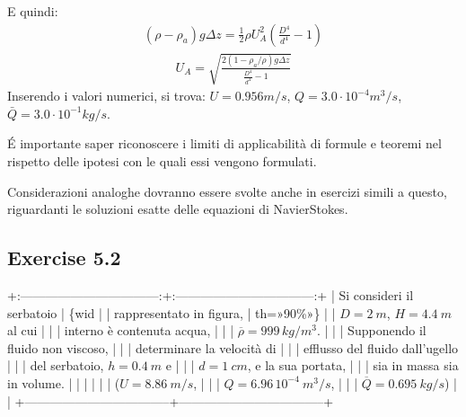 \documentclass[letterpaper,10pt,italian]{jupyterBook}
\begin{document}
\begin{itemize}
\begin{equation*}
\end{equation*}
\sphinxAtStartPar
E quindi:
\begin{equation*}
\begin{split}(\rho - \rho_a ) g \Delta z = \frac{1}{2}\rho U_A^2 \displaystyle\left( \frac{D^4}{d^4} - 1 \right)\end{split}
\end{equation*}\begin{equation*}
\begin{split}U_A = \displaystyle\sqrt{\frac{2 (1 - \rho_a / \rho) g \Delta z}{\frac{D^4}{d^4} - 1}}\end{split}
\end{equation*}
\sphinxAtStartPar
Inserendo i valori numerici, si trova: \(U = 0.956 m/s\),
\(Q = 3.0 \cdot 10^{-4} m^3/s\), \(\bar{Q} = 3.0 \cdot 10^{-1} kg/s\).

\end{itemize}

\sphinxAtStartPar
{} É importante saper riconoscere i limiti di applicabilità
di formule e teoremi nel rispetto delle ipotesi con le quali essi
vengono formulati.

\sphinxAtStartPar
Considerazioni analoghe dovranno essere svolte anche in esercizi simili
a questo, riguardanti le soluzioni esatte delle equazioni di
Navier\sphinxhyphen{}Stokes.

\sphinxstepscope


\subsection{Exercise 5.2}
\label{\detokenize{polimi/fluidmechanics-ita/template/capitoli/05_bernoulli/0501in:exercise-5-2}}\label{\detokenize{polimi/fluidmechanics-ita/template/capitoli/05_bernoulli/0501in:fluid-mechanics-bernoulli-ex-02}}\label{\detokenize{polimi/fluidmechanics-ita/template/capitoli/05_bernoulli/0501in::doc}}
\sphinxAtStartPar
+:———————————:+:———————————:+
| Si consideri il serbatoio         | \{wid |
| rappresentato in figura,          | th=»90\%»\}                         |
| \(D=2\ m\), \(H=4.4\ m\) al cui       |                                   |
| interno è contenuta acqua,        |                                   |
| \(\overline{\rho}=999\,{kg/m^3}\).  |                                   |
| Supponendo il fluido non viscoso, |                                   |
| determinare la velocità di        |                                   |
| efflusso del fluido dall’ugello   |                                   |
| del serbatoio, \(h=0.4\ m\) e       |                                   |
| \(d = 1\ cm\), e la sua portata,    |                                   |
| sia in massa sia in volume.       |                                   |
|                                   |                                   |
| (\(U = 8.86\ m/s\),                 |                                   |
| \(Q=6.96\, 10^{-4}\ m^3/s\),        |                                   |
| \(\overline{Q}=0.695\ kg/s\))       |                                   |
+———————————–+———————————–+
\end{document}
